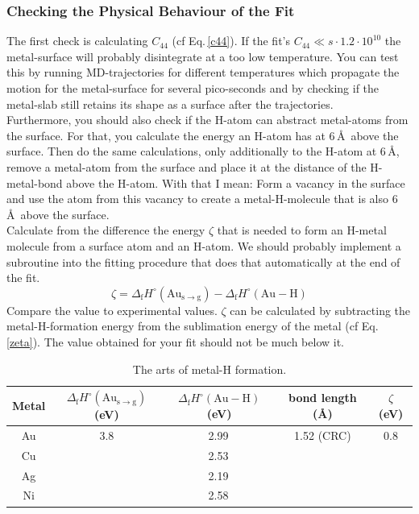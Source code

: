 \documentclass[twoside, 11pt, titlepage, captions=nooneline, a4paper, headsepline]{scrbook}%
\begin{document}
\subsubsection*{Checking the Physical Behaviour of the Fit}
The first check is calculating $C_{44}$ (cf Eq.\,\ref{c44}). If the fit's $C_{44}\ll s\cdot1.2\cdot10^{10}$ the metal-surface will probably disintegrate at a too low temperature. You can test this by running MD-trajectories for different temperatures which propagate the motion for the metal-surface for several pico-seconds and by checking if the metal-slab still retains its shape as a surface after the trajectories.\\
Furthermore, you should also check if the H-atom can abstract metal-atoms from the surface. For that, you calculate the energy an H-atom has at 6\,\AA~above the surface. Then do the same calculations, only additionally to the H-atom at 6\,\AA, remove a metal-atom from the surface and place it at the distance of the H-metal-bond above the H-atom. With that I mean: Form a vacancy in the surface and use the atom from this vacancy to create a metal-H-molecule that is also 6\,\AA~above the surface.\\
Calculate from the difference the energy $\zeta$ that is needed to form an H-metal molecule from a surface atom and an H-atom. We should probably implement a subroutine into the fitting procedure that does that automatically at the end of the fit.\\
\begin{equation}
\zeta = \Delta_\mathrm{f} H^\circ(\mathrm{Au_{s\rightarrow g}})-\Delta_\mathrm{f}H^\circ(\mathrm{Au-H})
\label{zeta}
\end{equation}
Compare the value to experimental values. $\zeta$ can be calculated by subtracting the metal-H-formation energy from the sublimation energy of the metal (cf Eq.\,\ref{zeta}). The value obtained for your fit should not be much below it.
\begin{table}[t!]
\centering
\caption{The arts of metal-H formation.}
\label{auh}
\begin{tabular}{ccccc}
\hline\hline
Metal&$\Delta_\mathrm{f} H^\circ(\mathrm{Au_{s\rightarrow g}})$(eV)&$\Delta_\mathrm{f}H^\circ(\mathrm{Au-H})$(eV)&bond length (\AA)&$\zeta$ (eV)\\
\hline
Au&3.8\cite{hildenbrand1962}&2.99\,\cite{kant1979}&1.52 (CRC)&0.8\\
Cu&&2.53\,\cite{kant1979}&&\\
Ag&&2.19\,\cite{kant1979}&&\\
Ni&&2.58\,\cite{kant1979}&&\\
\hline\hline
\end{tabular}
\end{table}
\end{document}
